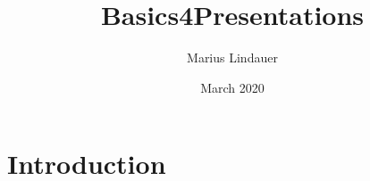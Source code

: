 \documentclass{article}
\title{Basics4Presentations}
\author{Marius Lindauer}
\date{March 2020}
\begin{document}
\maketitle

\section{Introduction}
\end{document}

